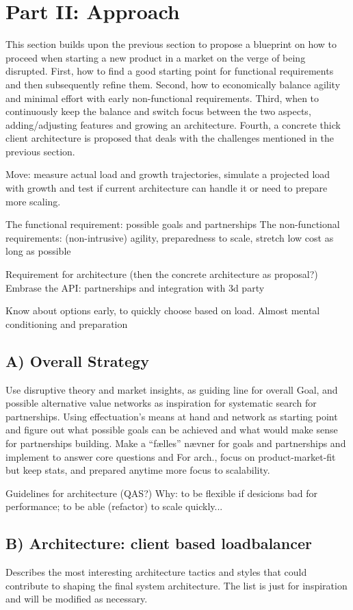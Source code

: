 \documentclass[a4paper,10pt]{article}
\begin{document}
\section{Part II: Approach}
This section builds upon the previous section to propose a blueprint on how to proceed when starting a new product in a market on the verge of being disrupted.
First, how to find a good starting point for functional requirements and then subsequently refine them.
Second, how to economically balance agility and minimal effort with early non-functional requirements.
Third, when to continuously keep the balance and switch focus between the two aspects, adding/adjusting features and growing an architecture.
Fourth, a concrete thick client architecture is proposed that deals with the challenges mentioned in the previous section.


Move: measure actual load and growth trajectories, simulate a projected load with growth and test if current architecture can handle it or need to prepare more scaling.


The functional requirement: possible goals and partnerships
The non-functional requirements: (non-intrusive) agility, preparedness to scale, stretch low cost as long as possible

Requirement for architecture (then the concrete architecture as proposal?)
Embrase the API: partnerships and integration with 3d party 

Know about options early, to quickly choose based on load. Almost mental conditioning and preparation

\subsection{A) Overall Strategy}
Use disruptive theory and market insights, as guiding line for overall Goal, and possible alternative value networks as inspiration for systematic search for partnerships.
Using effectuation's means at hand and network as starting point and figure out what possible goals can be achieved and what would make sense for partnerships building.
Make a ``fælles'' nævner for goals and partnerships and implement to answer core questions and 
For arch., focus on product-market-fit but keep stats, and prepared anytime more focus to scalability.

Guidelines for architecture (QAS?)
Why: to be flexible if desicions bad for performance; to be able (refactor) to scale quickly...

\subsection{B) Architecture: client based loadbalancer}
Describes the most interesting architecture tactics and styles that could contribute to shaping the final system architecture.
The list is just for inspiration and will be modified as necessary.
\end{document}
